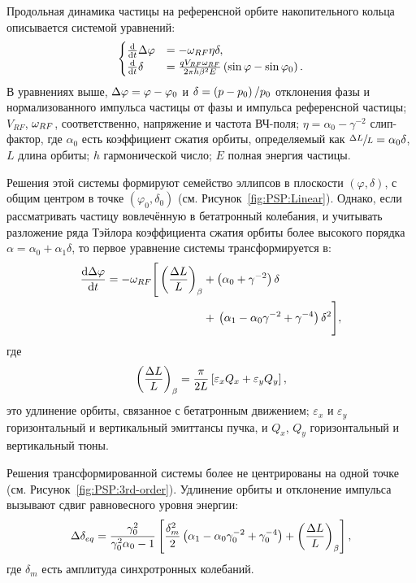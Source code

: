 Продольная динамика частицы на референсной орбите накопительного кольца описывается
системой уравнений:
\begin{equation}
\begin{cases}
\ddt{}\D\varphi &= -\w_{RF}\eta\delta, \\
\ddt{}\delta &= \frac{q V_{RF}\w_{RF}}{2\pi h\beta^2E}\bkt{\sin\varphi - \sin\varphi_0}.
\end{cases}
\end{equation}
В уравнениях выше, $\Delta\varphi = \varphi - \varphi_0$ и
$\delta = \bkt{p-p_0}/{p_0}$ отклонения фазы и нормализованного импульса частицы
от фазы и импульса референсной частицы;
 $V_{RF}$, $\omega_{RF}$, соответственно,
 напряжение и частота ВЧ-поля; $\eta = \alpha_0 - \gamma^{-2}$ слип-фактор,
 где $\alpha_0$ есть коэффициент сжатия орбиты, определяемый как $\sfrac{\Delta L}{L} = \alpha_0\delta$,
 $L$ длина орбиты; $h$ гармонической число; $E$ полная энергия частицы.

Решения этой системы формируют семейство эллипсов в плоскости $(\varphi, \delta)$, с общим центром в
точке $(\varphi_0,\delta_0)$ (см. Рисунок~\ref{fig:PSP:Linear}). Однако, если рассматривать частицу вовлечённую в бетатронный колебания, и
учитывать разложение ряда Тэйлора коэффициента сжатия орбиты более высокого порядка
$\alpha = \alpha_0 + \alpha_1\delta$, то первое уравнение системы
трансформируется в:~\cite[p.~2579]{Senichev:IPAC13}
\begin{align*}
\ddt{\D\varphi} = -\w_{RF} \Bigg[\bkt{\frac{\Delta L}{L}}_\beta &+ \bkt{\alpha_0 + \gamma^{-2}}\delta \Bigg.\\
&+ \Bigg.\bkt{\alpha_1 - \alpha_0\gamma^{-2} + \gamma^{-4}}\delta^2\Bigg],
\end{align*}
где 
\begin{equation}\label{eq:betatron_OL}
	\bkt{\frac{\Delta L}{L}}_\beta = \frac{\pi}{2L}\bkt*{\varepsilon_xQ_x + \varepsilon_yQ_y},
\end{equation}
 это
удлинение орбиты, связанное с бетатронным движением; $\varepsilon_x$ и $\varepsilon_y$ 
горизонтальный и вертикальный эмиттансы пучка, и $Q_x$, $Q_y$ горизонтальный и вертикальный тюны.

Решения трансформированной системы более не центрированы на одной точке (см. Рисунок~\ref{fig:PSP:3rd-order}). Удлинение орбиты
и отклонение импульса вызывают сдвиг равновесного уровня энергии:~\cite[p.~2581]{Senichev:IPAC13}
\begin{equation}\label{eq:EquLevMom_shift}
\Delta\delta_{eq} = \frac{\gamma_0^2}{\gamma_0^2\alpha_0 - 1}\bkt*{\frac{\delta_m^2}{2}\bkt{\alpha_1 - \alpha_0\gamma_0^{-2} + \gamma_0^{-4}} + \bkt{\frac{\Delta L}{L}}_\beta},
\end{equation}
где $\delta_m$ есть амплитуда синхротронных колебаний.

